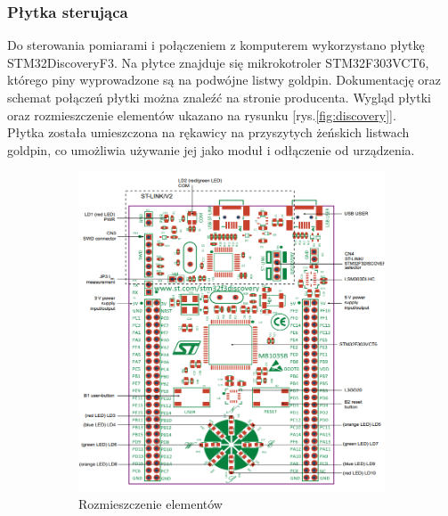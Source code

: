 \documentclass[12pt,a4paper]{article}
\begin{document}
\newpage
\subsubsection{Płytka sterująca}
Do sterowania pomiarami i połączeniem z komputerem wykorzystano płytkę STM32DiscoveryF3. Na płytce znajduje się mikrokotroler STM32F303VCT6, którego piny wyprowadzone są na podwójne listwy goldpin. Dokumentację oraz schemat połączeń płytki można znaleźć na stronie producenta. Wygląd płytki oraz rozmieszczenie elementów ukazano na rysunku [rys.\ref{fig:discovery}].\\
Płytka została umieszczona na rękawicy na przyszytych żeńskich listwach goldpin, co umożliwia używanie jej jako moduł i odłączenie od urządzenia.
\begin{figure}[!htb]
\centering
\begin{subfigure}{.5\textwidth}
	\centering
	\includegraphics[height=.35\textheight]{images/stm32f3layout.png}
	\caption{Rozmieszczenie elementów}
	\label{fig:gotowa}
\end{subfigure}%
\begin{subfigure}{.5\textwidth}
	\centering

\end{subfigure}
\end{figure}
\end{document}
